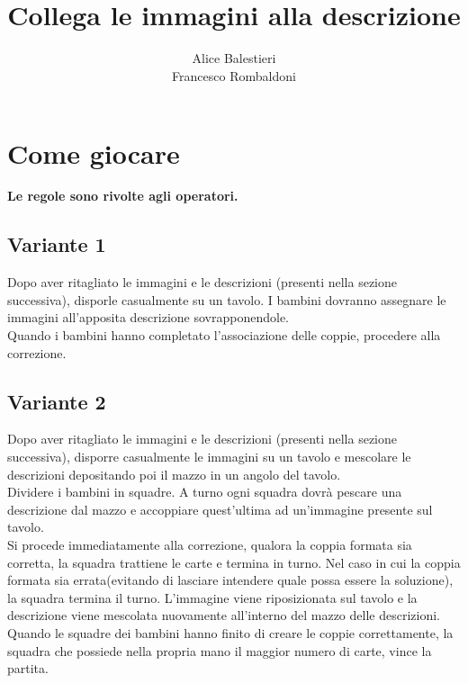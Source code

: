 \documentclass[hidelinks,12pt,a4paper]{article}
\begin{document}
	
	\title{\textbf{\\Collega le immagini alla descrizione}}
	\author{Alice Balestieri\\Francesco Rombaldoni}
	\date{}
	
	\maketitle
	\newpage
	
	\tableofcontents
	\newpage
	
	\section{Come giocare}
	\begin{center}
		\textbf{Le regole sono rivolte agli operatori.}
	\end{center}
	
	\subsection{Variante 1}
	 Dopo aver ritagliato le immagini e le descrizioni (presenti nella sezione successiva), disporle casualmente su un tavolo. I bambini dovranno assegnare le immagini all'apposita descrizione sovrapponendole.\\
	Quando i bambini hanno completato l'associazione delle coppie, procedere alla correzione.
	
	\subsection{Variante 2}
	Dopo aver ritagliato le immagini e le descrizioni (presenti nella sezione successiva), disporre casualmente le immagini su un tavolo e mescolare le descrizioni depositando poi il mazzo in un angolo del tavolo.\\
	Dividere i bambini in squadre. A turno ogni squadra dovrà pescare una descrizione dal mazzo e accoppiare quest'ultima ad un'immagine presente sul tavolo.\\
	Si procede immediatamente alla correzione, qualora la coppia formata sia corretta, la squadra trattiene le carte e termina in turno. Nel caso in cui la coppia formata sia errata(evitando di lasciare intendere quale possa essere la soluzione), la squadra termina il turno. L'immagine viene riposizionata sul tavolo e la descrizione viene mescolata nuovamente all'interno del mazzo delle descrizioni.\\
	Quando le squadre dei bambini hanno finito di creare le coppie correttamente, la squadra che possiede nella propria mano il maggior numero di carte, vince la partita.
	
\end{document}

